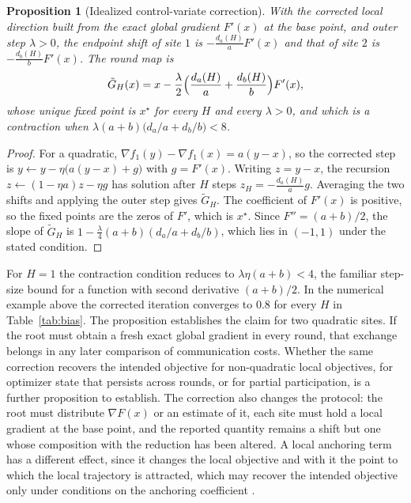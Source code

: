 \documentclass[11pt]{article}
\newtheorem{proposition}{Proposition}
\theoremstyle{definition}
\theoremstyle{remark}
\begin{document}
\begin{proposition}[Idealized control-variate correction]\label{prop:cv}
With the corrected local direction built from the exact global gradient $F'(x)$ at the base point, and outer step $\lambda>0$, the endpoint shift of site $1$ is $-\tfrac{d_a(H)}{a}F'(x)$ and that of site $2$ is $-\tfrac{d_b(H)}{b}F'(x)$. The round map is
\[
\tilde G_H(x)=x-\frac\lambda2\Bigl(\frac{d_a(H)}{a}+\frac{d_b(H)}{b}\Bigr)F'(x),
\]
whose unique fixed point is $x^\star$ for every $H$ and every $\lambda>0$, and which is a contraction when $\lambda(a+b)\bigl(d_a/a+d_b/b\bigr)<8$.
\end{proposition}

\begin{proof}
For a quadratic, $\nabla f_1(y)-\nabla f_1(x)=a(y-x)$, so the corrected step is $y\leftarrow y-\eta\bigl(a(y-x)+g\bigr)$ with $g=F'(x)$. Writing $z=y-x$, the recursion $z\leftarrow(1-\eta a)z-\eta g$ has solution after $H$ steps $z_H=-\tfrac{d_a(H)}{a}g$. Averaging the two shifts and applying the outer step gives $\tilde G_H$. The coefficient of $F'(x)$ is positive, so the fixed points are the zeros of $F'$, which is $x^\star$. Since $F''=(a+b)/2$, the slope of $\tilde G_H$ is $1-\tfrac\lambda4(a+b)(d_a/a+d_b/b)$, which lies in $(-1,1)$ under the stated condition.
\end{proof}

For $H=1$ the contraction condition reduces to $\lambda\eta(a+b)<4$, the familiar step-size bound for a function with second derivative $(a+b)/2$. In the numerical example above the corrected iteration converges to $0.8$ for every $H$ in Table~\ref{tab:bias}. The proposition establishes the claim for two quadratic sites. If the root must obtain a fresh exact global gradient in every round, that exchange belongs in any later comparison of communication costs. Whether the same correction recovers the intended objective for non-quadratic local objectives, for optimizer state that persists across rounds, or for partial participation, is a further proposition to establish. The correction also changes the protocol: the root must distribute $\nabla F(x)$ or an estimate of it, each site must hold a local gradient at the base point, and the reported quantity remains a shift but one whose composition with the reduction has been altered. A local anchoring term has a different effect, since it changes the local objective and with it the point to which the local trajectory is attracted, which may recover the intended objective only under conditions on the anchoring coefficient \cite{li2020}.
\end{document}
